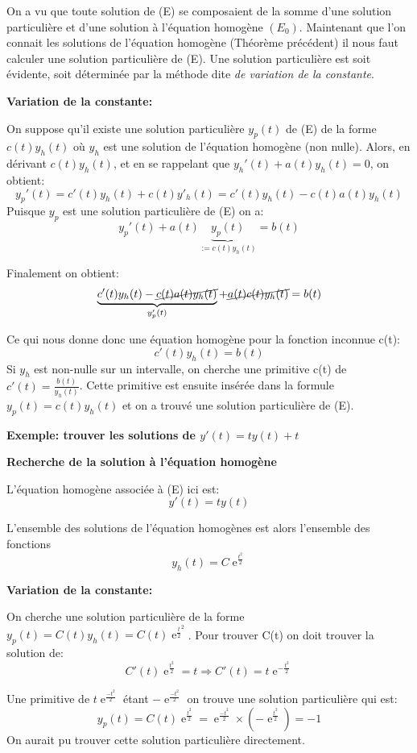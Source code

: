 \documentclass[a4paper]{article}
\theoremstyle{break}
\DeclareMathOperator{\e}{e} %
\begin{document}
On a vu que toute solution de (E) se composaient de la somme d'une
solution particulière et d'une solution à l'équation homogène
$(E_0)$. Maintenant que l'on connait les solutions de l'équation
homogène (Théorème précédent) il nous faut calculer une solution
particulière de (E). Une solution particulière est soit évidente, soit
déterminée par la méthode dite \emph{de variation de la constante}.

\textbf{Variation de la constante: }

On suppose qu'il existe une solution particulière $y_p(t)$ de (E) de
la forme $c(t)y_h(t)$ où $y_h$ est une solution de l'équation homogène
(non nulle). Alors, en dérivant $c(t)y_h(t)$, et en se rappelant que
$y_h'(t) + a(t) y_h(t) = 0$, on obtient:
\[
  y_p'(t) = c'(t) y_h(t) + c(t) y'_h(t) = c'(t) y_h(t) - c(t) a(t) y_h(t) 
\]
Puisque $y_p$ est une solution particulière de (E) on a:
\[
  y_p'(t) + a(t) \underbrace{y_p(t)}_{:= c(t) y_h(t)} = b(t) 
\]

Finalement on obtient:
\[
  \underbrace{c'(t) y_h(t) - \cancel{c(t) a(t) y_h(t)}}_{y_p'(t)}
  + \cancel{a(t) c(t) y_h(t)} = b(t) 
\]

Ce qui nous donne donc une équation homogène pour la fonction inconnue
c(t):
\[
  c'(t) y_h(t) = b(t)
\]
Si $y_h$ est non-nulle sur un intervalle, on cherche une primitive
c(t) de $c'(t) = \frac{b(t)}{y_h(t)}$. Cette primitive est ensuite
insérée dans la formule $y_p(t) = c(t) y_h(t)$ et on a trouvé une
solution particulière de (E).

\textbf{Exemple: trouver les solutions de $y'(t) = ty(t) + t$}

\textbf{Recherche de la solution à l'équation homogène}

L'équation homogène associée à (E) ici est:
\[
  y'(t) = ty(t)
\]

L'ensemble des solutions de l'équation homogènes est alors l'ensemble
des fonctions
\[
  y_h(t) = C \e^{\frac{t^2}{2}}
\]

\vspace{1\baselineskip}

\textbf{Variation de la constante:}

On cherche une solution particulière de la forme $y_p(t) = C(t) y_h(t)
= C(t) \e^{\frac{t}{2}^2}$. Pour trouver C(t) on doit trouver la
solution de:
\[
  C'(t) \e^{\frac{t^2}{2}} = t \Rightarrow C'(t) = t\e^{-\frac{t^2}{2}}
\]

Une primitive de $t\e^{\frac{-t^2}{2}}$ étant $-\e^{\frac{-t^2}{2}}$
on trouve une solution particulière qui est:
\[
  y_p(t) = C(t) \e^{\frac{t^2}{2}} = \e^{\frac{-t^2}{2}} \times
  (-\e^{\frac{t^2}{2}}) = -1
\]
On aurait pu trouver cette solution particulière directement.
\end{document}
